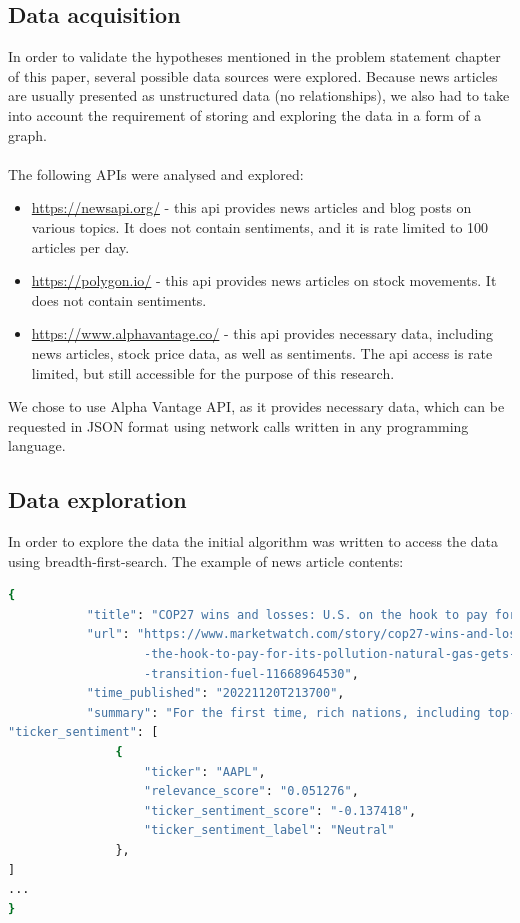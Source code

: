 \subsection{Data acquisition}
\label{cha:data-acquisition}
In order to validate the hypotheses mentioned in the problem statement chapter of this paper, several possible data sources were explored. 
Because news articles are usually presented as unstructured data (no relationships), we also had to take into account the requirement of storing and exploring the data in a form of a graph.\\
\\
\noindent The following APIs were analysed and explored: \\

\begin{itemize}
\item[-] \url{https://newsapi.org/} - this api provides news articles and blog posts on various topics. It does not contain sentiments, and it is rate limited to 100 articles per day.
\item[-] \url{https://polygon.io/} - this api provides news articles on stock movements. It does not contain sentiments.
\item[-] \url{https://www.alphavantage.co/} - this api provides necessary data, including news articles, stock price data, as well as sentiments. The api access is rate limited, but still accessible for the purpose of this research.
\end{itemize}

\noindent We chose to use Alpha Vantage API, as it provides necessary data, which can be requested in JSON format using network calls written in any programming language.

\subsection{Data exploration}
\label{cha:data-exploration}
In order to explore the data the initial algorithm was written to access the data using breadth-first-search.
The example of news article contents:

\begin{lstlisting}[caption=Example of news article contents, captionpos=b, language=bash, label={lst:example-news-article-contents}]
{
           "title": "COP27 wins and losses: U.S. on the hook to pay for its pollution; natural gas gets nod as transition fuel",
           "url": "https://www.marketwatch.com/story/cop27-wins-and-losses-u-s-on
                   -the-hook-to-pay-for-its-pollution-natural-gas-gets-nod-as
                   -transition-fuel-11668964530",
           "time_published": "20221120T213700",
           "summary": "For the first time, rich nations, including top-polluting U.S., will pay for climate change damage inflicted on poorer nations. 'Developing' China can opt out."
"ticker_sentiment": [
               {
                   "ticker": "AAPL",
                   "relevance_score": "0.051276",
                   "ticker_sentiment_score": "-0.137418",
                   "ticker_sentiment_label": "Neutral"
               },
]
...
}
\end{lstlisting}


